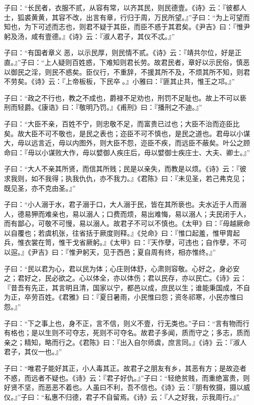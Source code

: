 \documentclass[]{article}
\begin{document}
子曰：``长民者，衣服不贰，从容有常，以齐其民，则民德壹。《诗》云：『彼都人士，狐裘黄黄，其容不改，出言有章，行归于周，万民所望。』''子曰：``为上可望而知也，为下可述而志也，则君不疑于其臣，而臣不惑于其君矣。《尹吉》曰：『惟尹躬及汤，咸有壹德。』《诗》云：『淑人君子，其仪不忒。』''

子曰：``有国者章义恶，以示民厚，则民情不贰。《诗》云：『靖共尔位，好是正直。』''子曰：``上人疑则百姓惑，下难知则君长劳。故君民者，章好以示民俗，慎恶以御民之淫，则民不惑矣。臣仪行，不重辞，不援其所不及，不烦其所不知，则君不劳矣。《诗》云：『上帝板板，下民卒。』小雅曰：『匪其止共，惟王之邛。』''

子曰：``政之不行也，教之不成也，爵禄不足劝也，刑罚不足耻也。故上不可以亵刑而轻爵。《康诰》曰：『敬明乃罚。』《甫刑》曰：『播刑之不迪。』''

子曰：``大臣不亲，百姓不宁，则忠敬不足，而富贵已过也；大臣不治而迩臣比矣。故大臣不可不敬也，是民之表也；迩臣不可不慎也，是民之道也。君毋以小谋大，毋以远言近，毋以内图外，则大臣不怨，迩臣不疾，而远臣不蔽矣。叶公之顾命曰：『毋以小谋败大作，毋以嬖御人疾庄后，毋以嬖御士疾庄士、大夫、卿士。』''

子曰：``大人不亲其所贤，而信其所贱；民是以亲失，而教是以烦。《诗》云：『彼求我则，如不我得；执我仇仇，亦不我力。』《君陈》曰：『未见圣，若己弗克见；既见圣，亦不克由圣。』''

子曰：``小人溺于水，君子溺于口，大人溺于民，皆在其所亵也。夫水近于人而溺人，德易狎而难亲也，易以溺人；口费而烦，易出难悔，易以溺人；夫民闭于人，而有鄙心，可敬不可慢，易以溺人。故君子不可以不慎也。《太甲》曰：『毋越厥命以自覆也；若虞机张，往省括于厥度则释。』《兑命》曰：『惟口起羞，惟甲胄起兵，惟衣裳在笥，惟干戈省厥躬。』《太甲》曰：『天作孽，可违也；自作孽，不可以逭。』《尹吉》曰：『惟尹躬天，见于西邑；夏自周有终，相亦惟终。』''

子曰：``民以君为心，君以民为体；心庄则体舒，心肃则容敬。心好之，身必安之；君好之，民必欲之。心以体全，亦以体伤；君以民存，亦以民亡。《诗》云：『昔吾有先正，其言明且清，国家以宁，都邑以成，庶民以生；谁能秉国成，不自为正，卒劳百姓。《君雅》曰：『夏日暑雨，小民惟曰怨；资冬祁寒，小民亦惟曰怨。』''

子曰：``下之事上也，身不正，言不信，则义不壹，行无类也。''子曰：``言有物而行有格也；是以生则不可夺志，死则不可夺名。故君子多闻，质而守之；多志，质而亲之；精知，略而行之。《君陈》曰：『出入自尔师虞，庶言同。』《诗》云：『淑人君子，其仪一也。』''

子曰：``唯君子能好其正，小人毒其正。故君子之朋友有乡，其恶有方；是故迩者不惑，而远者不疑也。《诗》云：『君子好仇。』''子曰：``轻绝贫贱，而重绝富贵，则好贤不坚，而恶恶不着也。人虽曰不利，吾不信也。《诗》云：『朋有攸摄，摄以威仪。』''子曰：``私惠不归德，君子不自留焉。《诗》云：『人之好我，示我周行。』''
\end{document}
